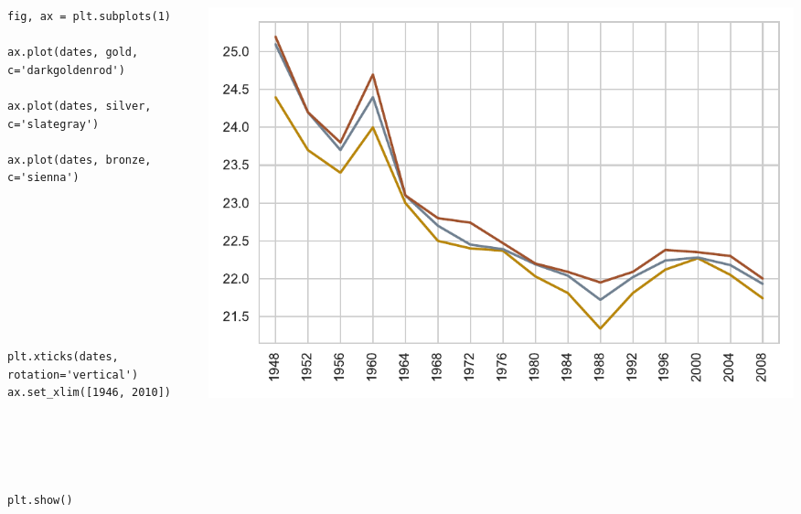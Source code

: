 \documentclass{beamer}
\begin{document}
\begin{frame}[fragile]
\tiny{
\begin{columns}
\begin{column}{0.45\textwidth}
\begin{verbatim}
fig, ax = plt.subplots(1)

ax.plot(dates, gold, c='darkgoldenrod')

ax.plot(dates, silver, c='slategray')

ax.plot(dates, bronze, c='sienna')









plt.xticks(dates, rotation='vertical')
ax.set_xlim([1946, 2010])





plt.show()
\end{verbatim}
\end{column}
\begin{column}{0.55\textwidth}
\includegraphics[width=\textwidth]{../olympics_3.pdf}
\end{column}
\end{columns}
}
\end{frame}
\end{document}
